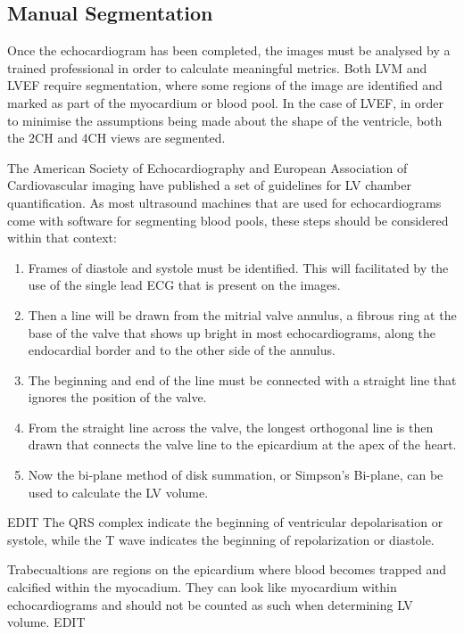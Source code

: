 \documentclass[12pt]{article}
\begin{document}
\subsection{Manual Segmentation}
Once the echocardiogram has been completed, the images must be analysed by a trained professional in order to calculate meaningful metrics.
Both LVM and LVEF require segmentation, where some regions of the image are identified and marked as part of the myocardium or blood pool.
In the case of LVEF, in order to minimise the assumptions being made about the shape of the ventricle, both the 2CH and 4CH views are segmented.
\par
The American Society of Echocardiography and European Association of Cardiovascular imaging have published a set of guidelines for LV chamber quantification. As most ultrasound machines that are used for echocardiograms come with software for segmenting blood pools, these steps should be considered within that context:
\begin{enumerate}
    \item Frames of diastole and systole must be identified. This will facilitated by the use of the single lead ECG that is present on the images.
    \item Then a line will be drawn from the mitrial valve annulus, a fibrous ring at the base of the valve that shows up bright in most echocardiograms, along the endocardial border and to the other side of the annulus.
    \item The beginning and end of the line must be connected with a straight line that ignores the position of the valve. 
    \item From the straight line across the valve, the longest orthogonal line is then drawn that connects the valve line to the epicardium at the apex of the heart.
    \item Now the bi-plane method of disk summation, or Simpson's Bi-plane, can be used to calculate the LV volume.
\end{enumerate}

EDIT
The QRS complex indicate the beginning of ventricular depolarisation or systole, while the T wave indicates the beginning of repolarization or diastole.
\par

Trabecualtions are regions on the epicardium where blood becomes trapped and calcified within the myocadium.\cite{jacc_ef_p_and_c}
They can look like myocardium within echocardiograms and should not be counted as such when determining LV volume. 
EDIT
\par
\end{document}
